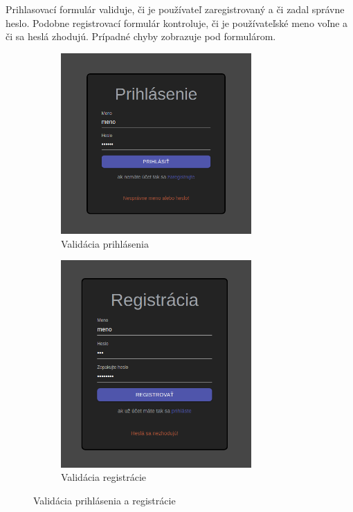 Prihlasovací formulár validuje, či je používateľ zaregistrovaný a či zadal správne heslo. Podobne
registrovací formulár kontroluje, či je používateľské meno voľne a či sa heslá zhodujú. Prípadné
chyby zobrazuje pod formulárom.
\begin{figure}[H]
\centering
\begin{subfigure}{.5\textwidth}
  \centering
  \includegraphics[width=0.8\textwidth]{images/validacia_prihlasenie}
  \caption[Validácia prihlásenia]{Validácia prihlásenia}
  \label{obr:validacia_prihlasenie}
\end{subfigure}%
\begin{subfigure}{.5\textwidth}
  \centering
  \includegraphics[width=0.8\textwidth]{images/validacia_registracia}
  \caption[Validácia registrácie]{Validácia registrácie}
  \label{obr:validacia_registracia}
\end{subfigure}
\caption{Validácia prihlásenia a registrácie}
\end{figure}

